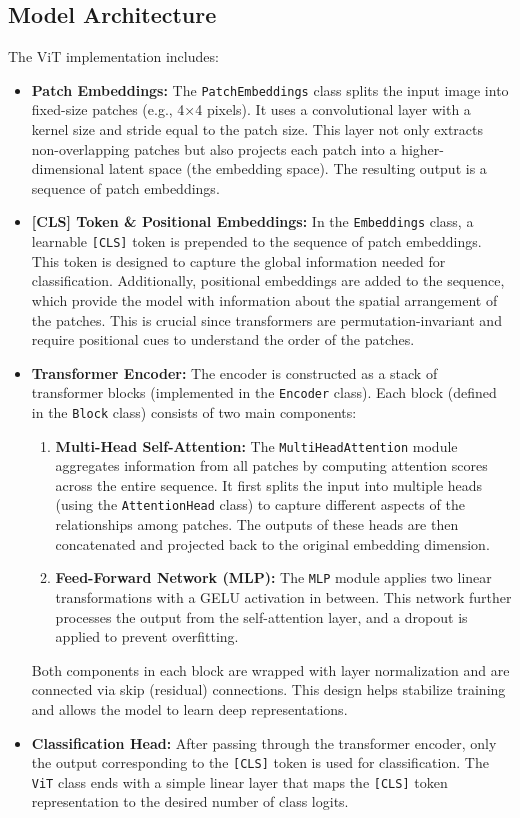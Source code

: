 \documentclass{article}
\begin{document}
\subsection*{Model Architecture}
The ViT implementation includes:
\begin{itemize}
    \item \textbf{Patch Embeddings:}
    The \texttt{PatchEmbeddings} class splits the input image into fixed-size patches (e.g., 4×4 pixels). It uses a convolutional layer with a kernel size and stride equal to the patch size. This layer not only extracts non-overlapping patches but also projects each patch into a higher-dimensional latent space (the embedding space). The resulting output is a sequence of patch embeddings.
    \item \textbf{[CLS] Token \& Positional Embeddings:}  
      In the \texttt{Embeddings} class, a learnable \texttt{[CLS]} token is prepended to the sequence of patch embeddings. This token is designed to capture the global information needed for classification. Additionally, positional embeddings are added to the sequence, which provide the model with information about the spatial arrangement of the patches. This is crucial since transformers are permutation-invariant and require positional cues to understand the order of the patches.
      
    \item \textbf{Transformer Encoder:}  
        The encoder is constructed as a stack of transformer blocks (implemented in the \texttt{Encoder} class). Each block (defined in the \texttt{Block} class) consists of two main components:
        \begin{enumerate}
            \item \textbf{Multi-Head Self-Attention:}  
                    The \texttt{MultiHeadAttention} module aggregates information from all patches by computing attention scores across the entire sequence. It first splits the input into multiple heads (using the \texttt{AttentionHead} class) to capture different aspects of the relationships among patches. The outputs of these heads are then concatenated and projected back to the original embedding dimension.
            \item \textbf{Feed-Forward Network (MLP):}  
                    The \texttt{MLP} module applies two linear transformations with a GELU activation in between. This network further processes the output from the self-attention layer, and a dropout is applied to prevent overfitting.
        \end{enumerate}
        Both components in each block are wrapped with layer normalization and are connected via skip (residual) connections. This design helps stabilize training and allows the model to learn deep representations.
        
    \item \textbf{Classification Head:}  
        After passing through the transformer encoder, only the output corresponding to the \texttt{[CLS]} token is used for classification. The \texttt{ViT} class ends with a simple linear layer that maps the \texttt{[CLS]} token representation to the desired number of class logits.
\end{itemize}
\end{document}
